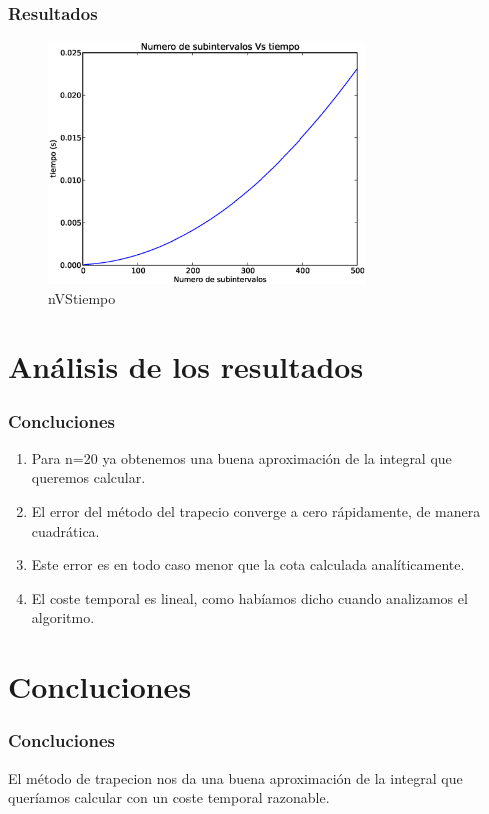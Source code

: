 \documentclass{beamer}
\begin{document}
\begin{frame}
  \frametitle{Resultados}
  \begin{figure}[!th]
    \begin{center}
      \includegraphics[width=0.75\textwidth]{img/Plot_nVStime.eps}
      \caption{nVStiempo}
      \label{fig:2}
    \end{center}
  \end{figure}
\end{frame}

\section{Análisis de los resultados}
  \begin{frame}
  \frametitle{Concluciones}
  \begin{enumerate}
    \item Para n=20 ya obtenemos una buena aproximación de la integral que queremos calcular.
    \pause
    \item El error del método del trapecio converge a cero rápidamente, de manera cuadrática.
    \pause
    \item Este error es en todo caso menor que la cota calculada analíticamente.
    \pause
    \item El coste temporal es lineal, como habíamos dicho cuando analizamos el algoritmo.
  \end{enumerate}
\end{frame}


\section{Concluciones}
\begin{frame}
 \frametitle{Concluciones}
  El método de trapecion nos da una buena aproximación de la integral que queríamos calcular con un coste temporal razonable.
\end{frame}
\end{document}
